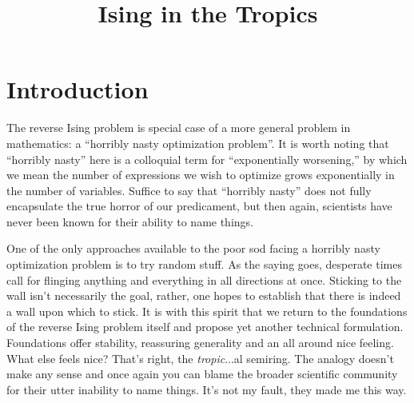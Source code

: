 
\usepackage{indentfirst}

\title{Ising in the Tropics}
\date{}

\usepackage{titling}
\renewcommand\maketitlehooka{\null\mbox{}\vfill}
\renewcommand\maketitlehookd{\vfill\null}

\setcounter{page}{1}
\setcounter{section}{-1}
\maketitle

\newpage

\tableofcontents
\newpage

\section{Introduction}
The reverse Ising problem is special case of a more general problem in mathematics: a ``horribly nasty optimization problem''. It is worth noting that ``horribly nasty'' here is a colloquial term for ``exponentially worsening,'' by which we mean the number of expressions we wish to optimize grows exponentially in the number of variables. Suffice to say that ``horribly nasty'' does not fully encapsulate the true horror of our predicament, but then again, scientists have never been known for their ability to name things.

One of the only approaches available to the poor sod facing a horribly nasty optimization problem is to try random stuff. As the saying goes, desperate times call for flinging anything and everything in all directions at once. Sticking to the wall isn't necessarily the goal, rather, one hopes to establish that there is indeed a wall upon which to stick. It is with this spirit that we return to the foundations of the reverse Ising problem itself and propose yet another technical formulation. Foundations offer stability, reassuring generality and an all around nice feeling. What else feels nice? That's right, the \emph{tropic}...al semiring. The analogy doesn't make any sense and once again you can blame the broader scientific community for their utter inability to name things. It's not my fault, they made me this way. 

